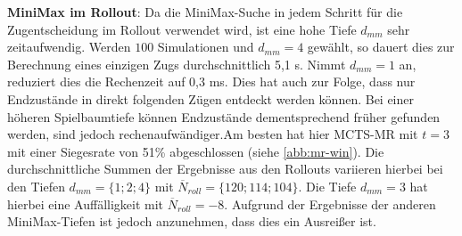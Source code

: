 \documentclass[12pt,a4paper,bibliography=totocnumbered,listof=totocnumbered]{article}
\begin{document}
\textbf{MiniMax im Rollout}: Da die MiniMax-Suche in jedem Schritt für die Zugentscheidung im Rollout verwendet wird, ist eine hohe Tiefe $d_{mm}$ sehr zeitaufwendig. Werden $100$ Simulationen und $d_{mm}=4$ gewählt, so dauert dies zur Berechnung eines einzigen Zugs durchschnittlich 5,1 s. Nimmt $d_{mm}=1$ an, reduziert dies die Rechenzeit auf 0,3 ms. Dies hat auch zur Folge, dass nur Endzustände in direkt folgenden Zügen entdeckt werden können. Bei einer höheren Spielbaumtiefe können Endzustände dementsprechend früher gefunden werden, sind jedoch rechenaufwändiger.Am besten hat hier MCTS-MR mit $t=3$ mit einer Siegesrate von 51\% abgeschlossen (siehe \autoref{abb:mr-win}). Die durchschnittliche Summen der Ergebnisse aus den Rollouts variieren hierbei bei den Tiefen $d_{mm}=\{1;2;4\}$ mit $\overline{N}_{roll}=\{120; 114; 104\}$. Die Tiefe $d_{mm}=3$ hat hierbei eine Auffälligkeit mit $\overline{N}_{roll}=-8$. Aufgrund der Ergebnisse der anderen MiniMax-Tiefen ist jedoch anzunehmen, dass dies ein Ausreißer ist.
\end{document}
